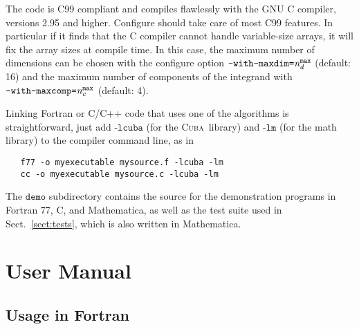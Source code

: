 \documentclass[12pt]{article}
\newcommand\cuba{\textsc{Cuba}}
\newcommand\Code[1]{\ensuremath{\texttt{#1}}}
\newcommand\Var[1]{\ensuremath{\mathit{#1}}}
\begin{document}
The code is C99 compliant and compiles flawlessly with the GNU C
compiler, versions 2.95 and higher.  Configure should take care of most
C99 features.  In particular if it finds that the C compiler cannot
handle variable-size arrays, it will fix the array sizes at compile
time.  In this case, the maximum number of dimensions can be chosen with
the configure option \Code{--with-maxdim=\Var{n_d^{\text{max}}}}
(default: 16) and the maximum number of components of the integrand with
\Code{--with-maxcomp=\Var{n_c^{\text{max}}}} (default: 4).

Linking Fortran or C/C++ code that uses one of the algorithms is
straightforward, just add \Code{-lcuba} (for the \cuba\ library) and
\Code{-lm} (for the math library) to the compiler command line, as in
\begin{verbatim}
   f77 -o myexecutable mysource.f -lcuba -lm
   cc -o myexecutable mysource.c -lcuba -lm
\end{verbatim}
The \Code{demo} subdirectory contains the source for the demonstration
programs in Fortran 77, C, and Mathematica, as well as the test suite
used in Sect.~\ref{sect:tests}, which is also written in Mathematica.


\section{User Manual}

\subsection{Usage in Fortran}
\end{document}
